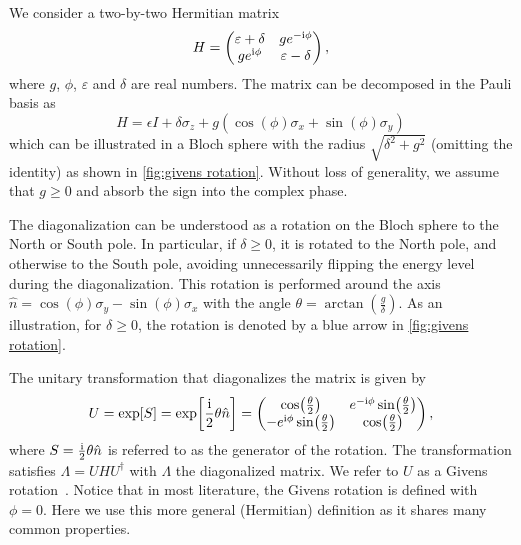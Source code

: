 \documentclass[%
 reprint,
 amsmath,amssymb,
 aps,
pra,
noeprint,
superscriptaddress,
]{revtex4-2}
\newcommand{\imagi}{\textnormal{i}}
\begin{document}
We consider a two-by-two Hermitian matrix
\begin{equation}
    \label{eq:two-by-two hamiltonian}
    H=
    \begin{pmatrix}
    \varepsilon+\delta & g e^{-\imagi\phi} \\
    g e^{\imagi\phi} & \varepsilon-\delta
    \end{pmatrix}
    ,
\end{equation}
where $g$, $\phi$, $\varepsilon$ and $\delta$ are real numbers.
The matrix can be decomposed in the Pauli basis as
\begin{equation}
    H = \epsilon I + \delta \sigma_z + g \left( \cos(\phi) \sigma_x + \sin(\phi) \sigma_y \right)
\end{equation}
which can be illustrated in a Bloch sphere with the radius $\sqrt{\delta^2+g^2}$ (omitting the identity) as shown in \cref{fig:givens rotation}.
Without loss of generality, we assume that $g \geq 0$ and absorb the sign into the complex phase.

The diagonalization can be understood as a rotation on the Bloch sphere to the North or South pole.
In particular, if $\delta \ge 0$, it is rotated to the North pole, and otherwise to the South pole, avoiding unnecessarily flipping the energy level during the diagonalization. 
This rotation is performed around the axis $\hat{n}=\cos(\phi) \sigma_y - \sin(\phi) \sigma_x$  with the angle $\theta=\arctan{(\frac{g}{\delta})}$.
As an illustration, for $\delta \ge 0$, the rotation is denoted by a blue arrow in \cref{fig:givens rotation}.


The unitary transformation that diagonalizes the matrix is given by
\begin{equation}
U = \exp[S] = \exp[\frac{\imagi}{2}\theta \hat{n}]=
\begin{pmatrix}
\cos(\frac{\theta}{2}) & e^{-\imagi\phi}\sin(\frac{\theta}{2}) \\
-e^{\imagi\phi}\sin(\frac{\theta}{2}) & \cos(\frac{\theta}{2}) 
\end{pmatrix}
,
\label{eq:given rotation}
\end{equation}
where $S=\frac{\imagi}{2}\theta  \hat{n}$ is referred to as the generator of the rotation.
The transformation satisfies $\Lambda=U H U^{\dagger}$ with $\Lambda$ the diagonalized matrix.
We refer to $U$ as a Givens rotation~\cite{van1996matrix}.
Notice that in most literature, the Givens rotation is defined with $\phi=0$.
Here we use this more general (Hermitian) definition as it shares many common properties.
\end{document}
